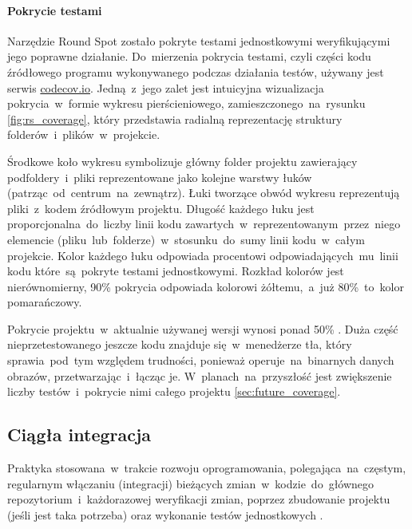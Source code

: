 \paragraph{Pokrycie testami}
\label{par:test_coverage}
Narzędzie Round Spot zostało pokryte testami jednostkowymi weryfikującymi jego poprawne działanie. Do~mierzenia pokrycia testami, czyli części kodu źródłowego programu wykonywanego podczas działania testów, używany jest serwis \href{https://codecov.io/}{codecov.io}. Jedną~z~jego zalet jest intuicyjna wizualizacja pokrycia~w~formie wykresu pierścieniowego, zamieszczonego~na~rysunku \ref{fig:rs_coverage}, który przedstawia radialną reprezentację struktury folderów~i~plików~w~projekcie. 

\bigskip
{}

Środkowe koło wykresu symbolizuje główny folder projektu zawierający podfoldery~i~pliki reprezentowane jako kolejne warstwy łuków (patrząc~od~centrum~na~zewnątrz). Łuki tworzące obwód wykresu reprezentują pliki~z~kodem źródłowym projektu. Długość każdego łuku jest proporcjonalna~do~liczby linii kodu zawartych~w~reprezentowanym~przez~niego elemencie (pliku~lub~folderze)~w~stosunku~do~sumy linii kodu~w~całym projekcie. Kolor każdego łuku odpowiada procentowi odpowiadających~mu~linii kodu które~są~pokryte testami jednostkowymi. Rozkład kolorów jest nierównomierny, 90\% pokrycia odpowiada kolorowi żółtemu,~a~już 80\%~to~kolor pomarańczowy. 

Pokrycie projektu~w~aktualnie używanej wersji wynosi ponad 50\% \cite{RS_Coverage}. Duża część nieprzetestowanego jeszcze kodu znajduje się~w~menedżerze tła, który sprawia~pod~tym względem trudności, ponieważ operuje~na~binarnych danych obrazów, przetwarzając~i~łącząc je. W~planach~na~przyszłość jest zwiększenie liczby testów~i~pokrycie nimi całego projektu \ref{sec:future_coverage}.

\subsection{Ciągła integracja}
\label{sec:rs_ci}
Praktyka stosowana~w~trakcie rozwoju oprogramowania, polegająca~na~częstym, regularnym włączaniu (integracji) bieżących zmian~w~kodzie~do~głównego repozytorium~i~każdorazowej weryfikacji zmian, poprzez zbudowanie projektu (jeśli jest taka potrzeba) oraz wykonanie testów jednostkowych \cite{CI_definition}.

